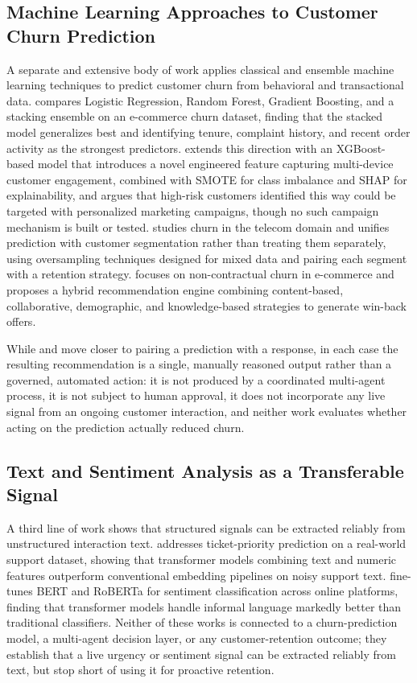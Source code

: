 \documentclass[conference]{IEEEtran}
\begin{document}
\subsection{Machine Learning Approaches to Customer Churn Prediction}
A separate and extensive body of work applies classical and ensemble machine learning techniques to predict customer churn from behavioral and transactional data. \cite{b7} compares Logistic Regression, Random Forest, Gradient Boosting, and a stacking ensemble on an e-commerce churn dataset, finding that the stacked model generalizes best and identifying tenure, complaint history, and recent order activity as the strongest predictors. \cite{b8} extends this direction with an XGBoost-based model that introduces a novel engineered feature capturing multi-device customer engagement, combined with SMOTE for class imbalance and SHAP for explainability, and argues that high-risk customers identified this way could be targeted with personalized marketing campaigns, though no such campaign mechanism is built or tested. \cite{b9} studies churn in the telecom domain and unifies prediction with customer segmentation rather than treating them separately, using oversampling techniques designed for mixed data and pairing each segment with a retention strategy. \cite{b10} focuses on non-contractual churn in e-commerce and proposes a hybrid recommendation engine combining content-based, collaborative, demographic, and knowledge-based strategies to generate win-back offers.

While \cite{b9} and \cite{b10} move closer to pairing a prediction with a response, in each case the resulting recommendation is a single, manually reasoned output rather than a governed, automated action: it is not produced by a coordinated multi-agent process, it is not subject to human approval, it does not incorporate any live signal from an ongoing customer interaction, and neither work evaluates whether acting on the prediction actually reduced churn.

\subsection{Text and Sentiment Analysis as a Transferable Signal}
A third line of work shows that structured signals can be extracted reliably from unstructured interaction text. \cite{b5} addresses ticket-priority prediction on a real-world support dataset, showing that transformer models combining text and numeric features outperform conventional embedding pipelines on noisy support text. \cite{b6} fine-tunes BERT and RoBERTa for sentiment classification across online platforms, finding that transformer models handle informal language markedly better than traditional classifiers. Neither of these works is connected to a churn-prediction model, a multi-agent decision layer, or any customer-retention outcome; they establish that a live urgency or sentiment signal can be extracted reliably from text, but stop short of using it for proactive retention.
\end{document}

